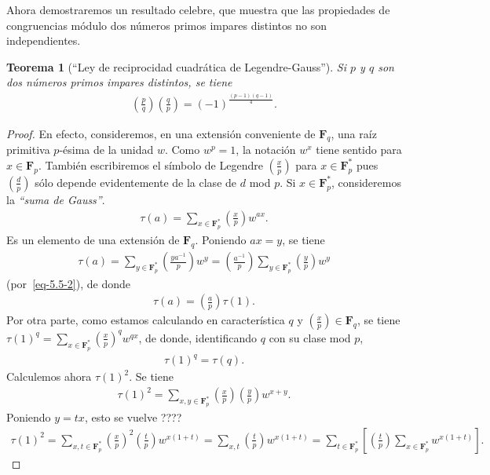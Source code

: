\documentclass[oneside,bibtotoc,leqno,spanish]{amsbook}
\newcommand{\FF}{\mathbf{F}}
\newcommand{\leg}[2]{\left(\frac{#1}{#2}\right)}
\numberwithin{equation}{section}
\theoremstyle{defi}
\theoremstyle{note}
\newtheorem{theorem}{Teorema}
\theoremstyle{rem}
\numberwithin{theorem}{section}
\numberwithin{proposition}{section}
\numberwithin{definition}{section}
\numberwithin{lemma}{section}
\numberwithin{corollary}{section}
\numberwithin{example}{section}
\numberwithin{footnote}{section}%
\begin{document}
Ahora demostraremos un resultado celebre, que muestra que las propiedades de congruencias m\'odulo dos
n\'umeros primos impares distintos no son independientes.

\begin{theorem}[``Ley de reciprocidad cuadr\'atica de Legendre-Gauss'']\label{teo5.5.1}
Si $p$ y $q$ son dos n\'umeros primos impares distintos, se tiene
\begin{gather*}
\leg{p}{q}\leg{q}{p}=(-1)^{\frac{(p-1)(q-1)}{4}}.
\end{gather*}
\end{theorem}

\begin{proof}
En efecto, consideremos, en una extensi\'on conveniente de $\FF_{q}$, una ra\'iz primitiva $p$-\'esima de
la unidad $w$. Como $w^{p}=1$, la notaci\'on $w^{x}$ tiene sentido para $x\in\FF_{p}$. Tambi\'en escribiremos
el s\'imbolo de Legendre $\leg{x}{p}$ para $x\in\FF_{p}^{*}$ pues $\leg{d}{p}$ s\'olo depende evidentemente
de la clase de $d$ mod $p$. Si $x\in\FF_{p}^{*}$, consideremos la {\em ``suma de Gauss''}.
\begin{gather}
\tau(a) = \sum_{x\in\FF_{p}^{*}}\leg{x}{p}w^{ax}.
\end{gather}
Es un elemento de una extensi\'on de $\FF_{q}$. Poniendo $ax = y$, se tiene
\begin{gather*}
\tau(a) = \sum_{y\in\FF_{p}^{*}}\leg{ya^{-1}}{p}w^{y} = \leg{a^{-1}}{p}\sum_{y\in\FF_{p}^{*}}\leg{y}{p}w^{y}
\end{gather*}
(por~\eqref{eq-5.5-2}), de donde
\begin{gather}\label{eq-5.5-4}
\tau(a) = \leg{a}{p}\tau(1).
\end{gather}
Por otra parte, como estamos calculando en caracter\'istica $q$ y $\leg{x}{p}\in\FF_{q}$, se tiene
$\tau(1)^{q}=\sum_{x\in\FF_{p}^{*}}\leg{x}{p}^{q}w^{qx}$, de donde, identificando $q$ con su clase mod $p$,
\begin{gather}\label{eq-5.5-5}
\tau(1)^{q}=\tau(q).
\end{gather}
Calculemos ahora $\tau(1)^{2}$. Se tiene
\begin{gather*}
\tau(1)^{2} = \sum_{x,y\in\FF_{p}^{*}}\leg{x}{p}\leg{y}{p}w^{x+y}.
\end{gather*}
Poniendo $y=tx$, esto se vuelve ????
\begin{gather*}
\tau(1)^{2}=\sum_{x,t\in\FF_{p}^{*}}\leg{x}{p}^{2}\leg{t}{p}w^{x(1+t)}=\sum_{x,t}\leg{t}{p}w^{x(1+t)}
=\sum_{t\in\FF_{p}^{*}}\left[\leg{t}{p}\sum_{x\in\FF_{p}^{*}}w^{x(1+t)}\right].

\end{gather*}
\end{proof}
\end{document}
